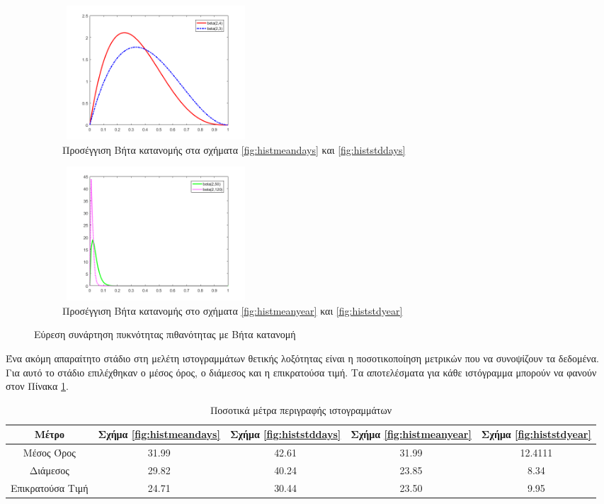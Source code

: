 \begin{figure}[ht!]
 \begin{subfigure}[b]{0.5\textwidth}
 \includegraphics[width=70mm, height=50mm]{../../plots/Consumption_Analysis/beta_days_plot.png}
\caption{Προσέγγιση Βήτα κατανομής στα σχήματα \ref{fig:histmeandays} και \ref{fig:histstddays}}
\label{fig:betadays}
 \end{subfigure}
 \quad
 \begin{subfigure}[b]{0.5\textwidth}
 \includegraphics[width=70mm, height=50mm]{../../plots/Consumption_Analysis/beta_year_plot.png}
\caption{Προσέγγιση Βήτα κατανομής στο σχήματα \ref{fig:histmeanyear} και \ref{fig:histstdyear}}
\label{fig:betadays}
 \end{subfigure}
	\caption{Εύρεση συνάρτηση πυκνότητας πιθανότητας με Βήτα κατανομή}
	\label{fig:betapdfs}
	\end{figure}

Ένα ακόμη απαραίτητο στάδιο στη μελέτη ιστογραμμάτων θετικής λοξότητας είναι η ποσοτικοποίηση μετρικών που να συνοψίζουν τα δεδομένα. Για αυτό το στάδιο επιλέχθηκαν ο μέσος όρος, ο διάμεσος και η επικρατούσα τιμή. Τα αποτελέσματα για κάθε ιστόγραμμα μπορούν να φανούν στον Πίνακα \ref{tab:metricshist}.
\begin{center}
\begin{table}[ht!]
\begin{tabular}{ |c|c|c|c|c| }
 \hline
 Μέτρο & Σχήμα \ref{fig:histmeandays} & Σχήμα \ref{fig:histstddays} & Σχήμα \ref{fig:histmeanyear} & Σχήμα \ref{fig:histstdyear}\\
 \hline
 Μέσος Όρος   		&   31.99  & 42.61 &31.99 &12.4111\\
 \hline
  Διάμεσος   		&   29.82  & 40.24 &23.85 &8.34\\ 
  \hline
  Επικρατούσα Τιμή  &   24.71  & 30.44 &23.50&9.95\\ 
   \hline
\end{tabular}
\caption{Ποσοτικά μέτρα περιγραφής ιστογραμμάτων}
\label{tab:metricshist}
\end{table}
\end{center}
